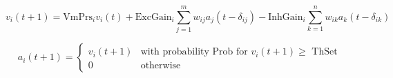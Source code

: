 \begin{equation}
  v_i(t+1) = \mbox{VmPrs}_i v_i(t)
           + \mbox{ExcGain}_i \sum_{j=1}^{m} w_{ij} a_j(t-\delta_{ij})
           - \mbox{InhGain}_i \sum_{k=1}^{n} w_{ik} a_k(t-\delta_{ik})
\end{equation}


\begin{equation}
  a_i(t+1) = \left\{
    \begin{array}{ll}
      v_i(t+1) & \mbox{with probability Prob for $v_i(t+1) \geq$ ThSet}\\
      0      & \mbox{otherwise}
    \end{array} \right.
\end{equation}
